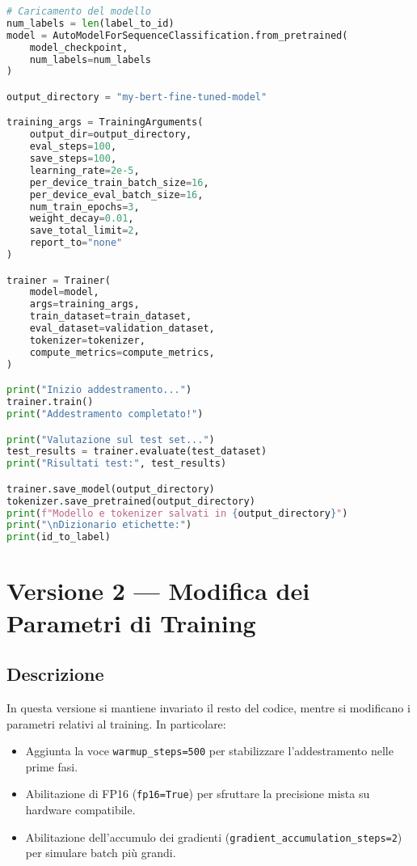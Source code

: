 \documentclass[a4paper,12pt]{article}
\begin{document}
\begin{lstlisting}[language=Python, caption={Versione 1}]
# Caricamento del modello
num_labels = len(label_to_id)
model = AutoModelForSequenceClassification.from_pretrained(
    model_checkpoint,
    num_labels=num_labels
)

output_directory = "my-bert-fine-tuned-model"

training_args = TrainingArguments(
    output_dir=output_directory,
    eval_steps=100,
    save_steps=100,
    learning_rate=2e-5,
    per_device_train_batch_size=16,
    per_device_eval_batch_size=16,
    num_train_epochs=3,
    weight_decay=0.01,
    save_total_limit=2,
    report_to="none"
)

trainer = Trainer(
    model=model,
    args=training_args,
    train_dataset=train_dataset,
    eval_dataset=validation_dataset,
    tokenizer=tokenizer,
    compute_metrics=compute_metrics,
)

print("Inizio addestramento...")
trainer.train()
print("Addestramento completato!")

print("Valutazione sul test set...")
test_results = trainer.evaluate(test_dataset)
print("Risultati test:", test_results)

trainer.save_model(output_directory)
tokenizer.save_pretrained(output_directory)
print(f"Modello e tokenizer salvati in {output_directory}")
print("\nDizionario etichette:")
print(id_to_label)
\end{lstlisting}

\section{Versione 2 --- Modifica dei Parametri di Training}
\subsection*{Descrizione}
In questa versione si mantiene invariato il resto del codice, mentre si modificano i parametri relativi al training. In particolare:
\begin{itemize}
    \item Aggiunta la voce \texttt{warmup\_steps=500} per stabilizzare l’addestramento nelle prime fasi.
    \item Abilitazione di FP16 (\texttt{fp16=True}) per sfruttare la precisione mista su hardware compatibile.
    \item Abilitazione dell’accumulo dei gradienti (\texttt{gradient\_accumulation\_steps=2}) per simulare batch più grandi.
\end{itemize}
\end{document}
